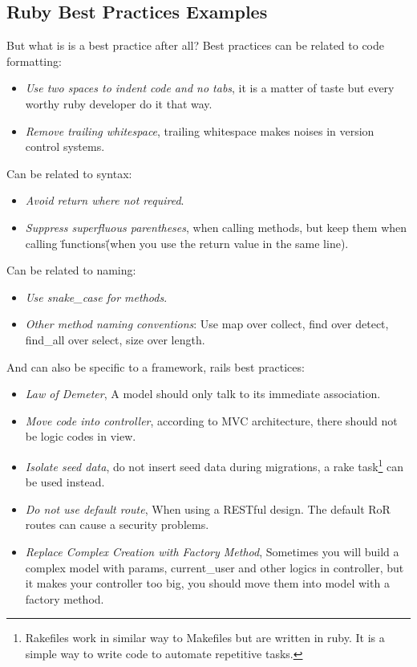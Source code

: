 \subsection{Ruby Best Practices Examples}
But what is is a best practice after all?
Best practices can be related to code formatting:
\begin{itemize}
\item \emph{Use two spaces to indent code and no tabs}, it is a matter of taste but every worthy ruby developer do it that way.
\item \emph{Remove trailing whitespace}, trailing whitespace makes noises in version control systems.
\end{itemize}

Can be related to syntax:
\begin{itemize}
\item \emph{Avoid return where not required}.
\item \emph{Suppress superfluous parentheses}, when calling methods, but keep them when calling \"functions\" (when you use the return value in the
  same line).
\end{itemize}

Can be related to naming:
\begin{itemize}
\item \emph{Use snake\_case for methods}.
\item \emph{Other method naming conventions}: Use map over collect, find over detect, find\_all over select, size over length.
\end{itemize}

And can also be specific to a framework, rails best practices:
\begin{itemize}
\item \emph{Law of Demeter}, A model should only talk to its immediate association.
\item \emph{Move code into controller}, according to MVC architecture, there should not be logic codes in view.
\item \emph{Isolate seed data}, do not insert seed data during migrations, a 
rake task\footnote{ Rakefiles work in similar way to Makefiles but are written in ruby. It is a simple way to write code to automate repetitive tasks. }
can be used instead.
\item \emph{Do not use default route}, When using a RESTful design. The default RoR routes can cause a security problems.
\item \emph{Replace Complex Creation with Factory Method}, Sometimes you will build a complex model with params, current\_user and other logics in controller, but it makes your controller too big, you should move them into model with a factory method.
\end{itemize}
